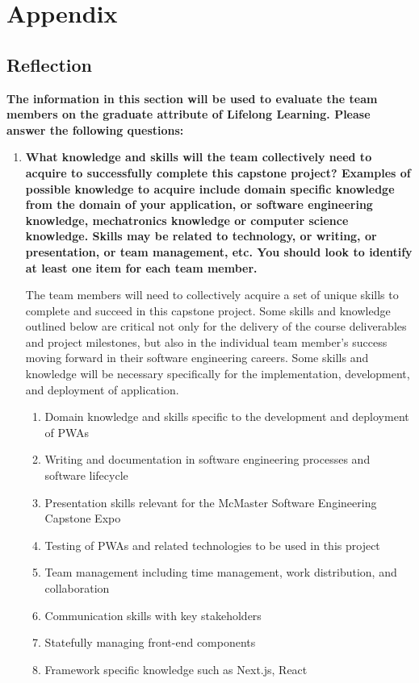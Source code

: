 \documentclass[12pt]{article}
\begin{document}
\section{Appendix}


\subsection{Reflection}

\textbf{The information in this section will be used to evaluate the team members on the graduate attribute
	of Lifelong Learning. Please answer the following questions:}

\begin{enumerate}
	\item \textbf{What knowledge and skills will the team collectively need to acquire to successfully complete this
		      capstone project? Examples of possible knowledge to acquire include domain specific knowledge from
		      the domain of your application, or software engineering knowledge, mechatronics knowledge or
		      computer science knowledge. Skills may be related to technology, or writing, or presentation, or
		      team management, etc. You should look to identify at least one item for each team member.}

	      The team members will need to collectively acquire a set of unique skills to complete and succeed
	      in this capstone project. Some skills and knowledge outlined below are critical not only for the
	      delivery of the course deliverables and project milestones, but also in the individual team
	      member's success moving forward in their software engineering careers. Some skills and knowledge
	      will be necessary specifically for the implementation, development, and deployment of application.
	      \begin{enumerate}[\arabic*.]
		      \item Domain knowledge and skills specific to the development and deployment of PWAs
		      \item Writing and documentation in software engineering processes and software lifecycle
		      \item Presentation skills relevant for the McMaster Software Engineering Capstone Expo
		      \item Testing of PWAs and related technologies to be used in this project
		      \item Team management including time management, work distribution, and collaboration
		      \item Communication skills with key stakeholders
		      \item Statefully managing front-end components
		      \item Framework specific knowledge such as Next.js, React
	      \end{enumerate}


\end{enumerate}
\end{document}
